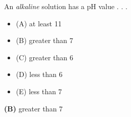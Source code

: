 

An {\it alkaline} solution has a pH value . . .

\begin{itemize}
\item{(A)} at least 11
\vskip 5pt 
\item{(B)} greater than 7
\vskip 5pt 
\item{(C)} greater than 6
\vskip 5pt 
\item{(D)} less than 6
\vskip 5pt 
\item{(E)} less than 7
\end{itemize}







{\bf (B)} greater than 7
 










